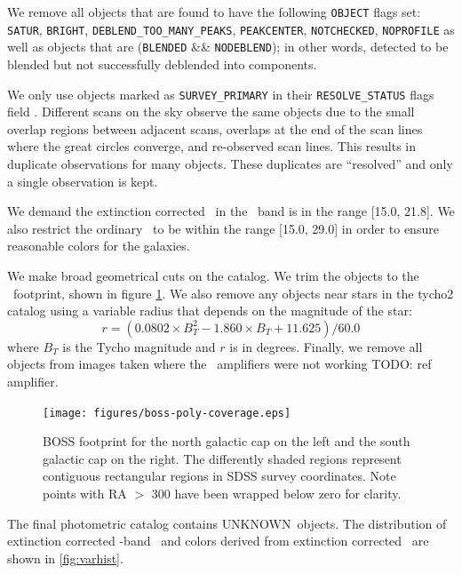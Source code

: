 \documentclass{emulateapj}
\newcommand{\modelrmin}{15.0}
\newcommand{\modelrmax}{29.0}
\newcommand{\rmin}{15.0}
\newcommand{\rmax}{21.8}
\newcommand{\nphoto}{{\color{red} UNKNOWN}}
\begin{document}
We remove all objects that are found to have the following \texttt{OBJECT}
flags set: \texttt{SATUR}, \texttt{BRIGHT}, \texttt{DEBLEND\_TOO\_MANY\_PEAKS},
\texttt{PEAKCENTER}, \texttt{NOTCHECKED}, \texttt{NOPROFILE} as well as objects
that are (\texttt{BLENDED} \&\& \texttt{NODEBLEND}); in other words, detected
to be blended but not successfully deblended into components. 

We only use objects marked as \texttt{SURVEY\_PRIMARY} in their
\texttt{RESOLVE\_STATUS} flags field \citep{dr7resolve}. Different scans on the
sky observe the same objects due to the small overlap regions between adjacent
scans, overlaps at the end of the scan lines where the great circles converge,
and re-observed scan lines.  This results in duplicate observations for many
objects.  These duplicates are ``resolved'' and only a single observation is
kept.

We demand the extinction corrected \citep{Schlegel98} \cmodelmag\ in the \rmag\
band is in the range [\rmin, \rmax].  We also restrict the ordinary \modelmag\
to be within the range [\modelrmin, \modelrmax] in order to ensure reasonable
colors for the galaxies.

We make broad geometrical cuts on the catalog.  We trim the objects to the
\boss\ footprint, shown in figure \ref{fig:footprint}. We also remove any
objects near stars in the tycho2 catalog \citep{tycho2} using a variable radius
that depends on the magnitude of the star:
\begin{equation}
r = (0.0802\times B_T^2 - 1.860\times B_T + 11.625)/60.0
\end{equation}
where $B_T$ is the Tycho magnitude and $r$ is in degrees.  Finally, we remove
all objects from images taken where the \umag\ amplifiers were not working
{\color{red}TODO: ref amplifier}.

\begin{figure}[t] \centering
 \centering 
 \texttt{[image: figures/boss-poly-coverage.eps]}
 \caption{BOSS footprint for the north galactic cap on the left
 and the south galactic cap on the right.  The differently shaded
 regions represent contiguous rectangular regions in SDSS survey coordinates.
 Note points with RA $>$ 300 have been wrapped below zero for clarity.}
 \label{fig:footprint}
\end{figure}

The final photometric catalog contains \nphoto\ objects.  The distribution of
extinction corrected \rmag-band \cmodelmag\ and colors derived from extinction
corrected \modelmag\ are shown in \ref{fig:varhist}.
\end{document}
